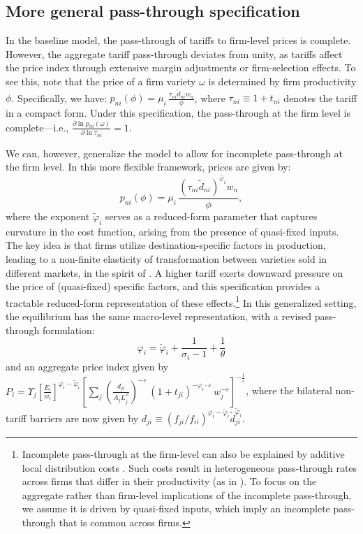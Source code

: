 \documentclass[12pt]{article}
\begin{document}
\subsection{More general pass-through specification}
\label{app:passthrough}
In the baseline model, the pass-through of tariffs to firm-level prices is complete. However, the aggregate tariff pass-through deviates from unity, as tariffs affect the price index through extensive margin adjustments or firm-selection effects. To see this, note that the price of a firm variety $\omega$ is determined by firm productivity $\phi$. Specifically, we have: $p_{ni}(\phi) = \mu_i\,\frac{\tau_{ni} \tilde{d}_{ni} w_n}{\phi}$, where $\tau_{ni} \equiv 1 + t_{ni}$ denotes the tariff in a compact form. Under this specification, the pass-through at the firm level is complete---i.e., $\frac{\partial\ln p_{ni}(\omega)}{\partial\ln\tau_{ni}}=1$.

We can, however, generalize the model to allow for incomplete pass-through at the firm level. In this more flexible framework, prices are given by:
\[
p_{ni}(\phi) = \mu_i\,\frac{(\tau_{ni} \tilde{d}_{ni})^{\tilde{\varphi_i}} w_n}{\phi},
\]
where the exponent $\tilde{\varphi}_i$ serves as a reduced-form parameter that captures curvature in the cost function, arising from the presence of quasi-fixed inputs. The key idea is that firms utilize destination-specific factors in production, leading to a non-finite elasticity of transformation between varieties sold in different markets, in the spirit of \cite{BAIER20011}. A higher tariff exerts downward pressure on the price of (quasi-fixed) specific factors, and this specification provides a tractable reduced-form representation of these effects.\footnote{Incomplete pass-through at the firm-level can also be explained by additive local distribution costs \citep{burstein2003distribution, corsetti2005macroeconomic, nakamura2010accounting}. Such costs result in heterogeneous pass-through rates across firms that differ in their productivity (as in \cite{berman2012different}). To focus on the aggregate rather than firm-level implications of the incomplete pass-through, we assume it is driven by quasi-fixed inputs, which imply an incomplete pass-through that is common across firms.} In this generalized setting, the equilibrium has the same macro-level representation, with a revised pass-through formulation:
\[
\varphi_{i}=\tilde{\varphi}_{i}+\frac{1}{\sigma_{i}-1}+\frac{1}{\theta}
\] and an aggregate price index given by $P_{i}=\Upsilon_{j}\left[\frac{E_{i}}{w_{i}}\right]^{\varphi_{i}-\tilde{\varphi}_i}\left[\sum_{j}\left(\frac{ d_{ji}}{A_{j}L_{j}^{\psi}}\right)^{-\varepsilon}\,(1+t_{ji})^{-\varphi_{i}\cdot\varepsilon}\,w_{j}^{-\varepsilon}\right]^{-\frac{1}{\varepsilon}}$, where the bilateral non-tariff barriers are now given by $d_{ji}\equiv(f_{ji}/ f_{ii})^{\varphi_i-\tilde{\varphi}_{i}} \tilde{d}_{ji}^{\tilde{\varphi}_{i}}$.
\end{document}
